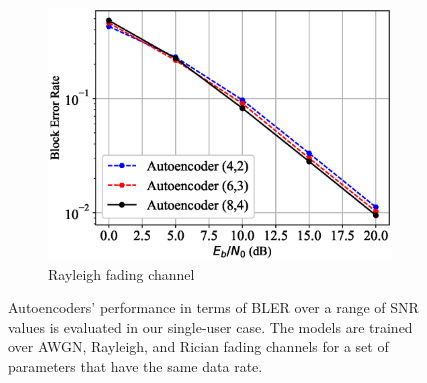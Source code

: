 \begin{figure}[!tp]
\begin{subfigure}{0.28\textwidth}
		\includegraphics[width=\linewidth]{figs/autoencoder_bler_rayleigh}
		\caption{Rayleigh fading channel}	
	\end{subfigure}
	\caption{Autoencoders' performance in terms of BLER over a range of SNR values is evaluated in our single-user case. The models are trained over AWGN, Rayleigh, and Rician fading channels for a set of parameters that have the same data rate.}
	\label{fig:autoencoder_bler}
\end{figure}
